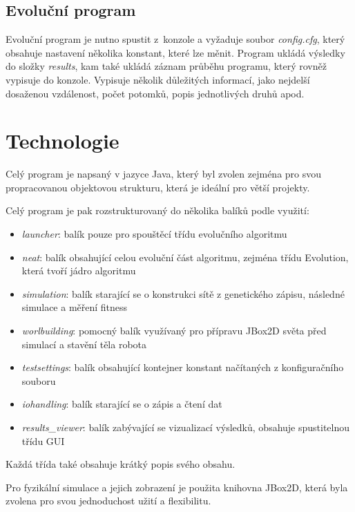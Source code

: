 \documentclass[a4]{article}
\begin{document}
\subsection{Evoluční program}
Evoluční program je nutno spustit z~konzole a vyžaduje soubor \emph{config.cfg}, který obsahuje nastavení několika konstant, které lze měnit. Program ukládá výsledky do složky \emph{results}, kam také ukládá záznam průběhu programu, který rovněž vypisuje do konzole. Vypisuje několik důležitých informací, jako nejdelší dosaženou vzdálenost, počet potomků, popis jednotlivých druhů apod.
\section{Technologie}
Celý program je napsaný v jazyce Java, který byl zvolen zejména pro svou propracovanou objektovou strukturu, která je ideální pro větší projekty. \par Celý program je pak rozstrukturovaný do několika balíků podle využití:
\begin{itemize}
\item{\emph{launcher}: balík pouze pro spouštěcí třídu evolučního algoritmu}
\item{\emph{neat}: balík obsahující celou evoluční část algoritmu, zejména třídu Evolution, která tvoří jádro algoritmu}
\item{\emph{simulation}: balík starající se o konstrukci sítě z genetického zápisu, následné simulace a měření fitness}
\item{\emph{worlbuilding}: pomocný balík využívaný pro přípravu JBox2D světa před simulací a stavění těla robota}
\item{\emph{testsettings}: balík obsahující kontejner konstant načítaných z konfiguračního souboru}
\item{\emph{iohandling}: balík starající se o zápis a čtení dat}
\item{\emph{results\_viewer}: balík zabývající se vizualizací výsledků, obsahuje spustitelnou třídu GUI}
\end{itemize}
Každá třída také obsahuje krátký popis svého obsahu.\par
Pro fyzikální simulace a jejich zobrazení je použita knihovna JBox2D\cite{jbox2D}, která byla zvolena pro svou jednoduchost užití a flexibilitu.
\end{document}

